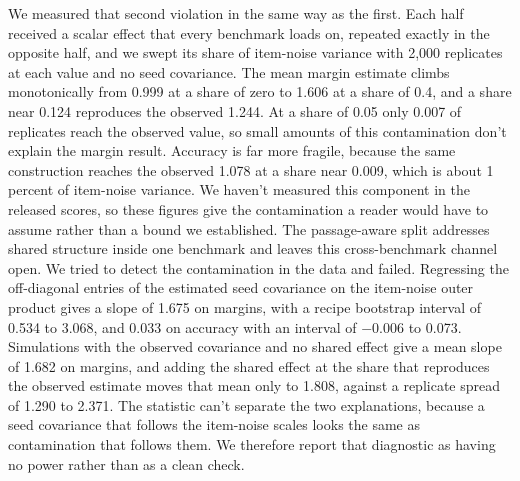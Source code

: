 We measured that second violation in the same way as the first. Each half received a scalar effect that every benchmark loads on, repeated exactly in the opposite half, and we swept its share of item-noise variance with 2,000 replicates at each value and no seed covariance. The mean margin estimate climbs monotonically from 0.999 at a share of zero to 1.606 at a share of 0.4, and a share near 0.124 reproduces the observed 1.244. At a share of 0.05 only 0.007 of replicates reach the observed value, so small amounts of this contamination don't explain the margin result. Accuracy is far more fragile, because the same construction reaches the observed 1.078 at a share near 0.009, which is about 1 percent of item-noise variance. We haven't measured this component in the released scores, so these figures give the contamination a reader would have to assume rather than a bound we established. The passage-aware split addresses shared structure inside one benchmark and leaves this cross-benchmark channel open. We tried to detect the contamination in the data and failed. Regressing the off-diagonal entries of the estimated seed covariance on the item-noise outer product gives a slope of 1.675 on margins, with a recipe bootstrap interval of 0.534 to 3.068, and 0.033 on accuracy with an interval of $-0.006$ to 0.073. Simulations with the observed covariance and no shared effect give a mean slope of 1.682 on margins, and adding the shared effect at the share that reproduces the observed estimate moves that mean only to 1.808, against a replicate spread of 1.290 to 2.371. The statistic can't separate the two explanations, because a seed covariance that follows the item-noise scales looks the same as contamination that follows them. We therefore report that diagnostic as having no power rather than as a clean check.

